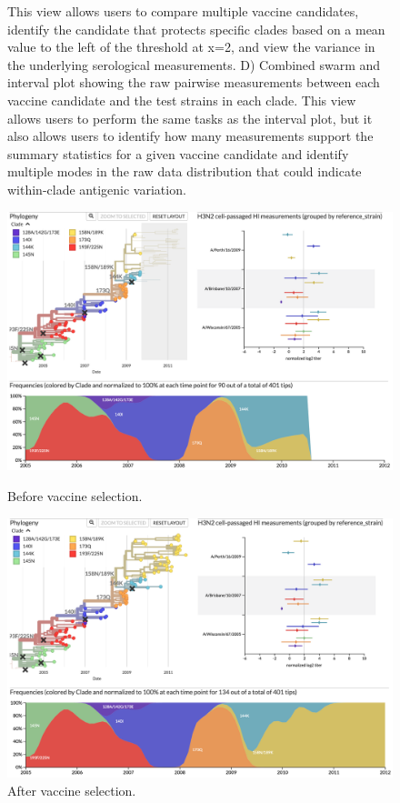\documentclass[utf8]{FrontiersinHarvard} %
\begin{document}
\begin{figure}[h!]
{This view allows users to compare multiple vaccine candidates, identify the candidate that protects specific clades based on a mean value to the left of the threshold at x=2, and view the variance in the underlying serological measurements.
D) Combined swarm and interval plot showing the raw pairwise measurements between each vaccine candidate and the test strains in each clade.
This view allows users to perform the same tasks as the interval plot, but it also allows users to identify how many measurements support the summary statistics for a given vaccine candidate and identify multiple modes in the raw data distribution that could indicate within-clade antigenic variation.
}\label{fig:1}
\end{figure}

\setcounter{figure}{2}
\setcounter{subfigure}{0}
\begin{subfigure}
\setcounter{figure}{2}
\setcounter{subfigure}{0}
    \centering
    \begin{minipage}[b]{0.75\textwidth}
        \includegraphics[width=\linewidth]{figures/figure-2a-mockup}
        \caption{Before vaccine selection.}
        \label{fig:2A}
    \end{minipage}

\setcounter{figure}{2}
\setcounter{subfigure}{1}
    \begin{minipage}[b]{0.75\textwidth}
        \includegraphics[width=\linewidth]{figures/figure-2b-mockup}
        \caption{After vaccine selection.}
        \label{fig:2B}
    \end{minipage}


\end{subfigure}
\end{document}
